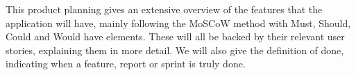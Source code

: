 This product planning gives an extensive overview of the features that the application will have, mainly following the MoSCoW method with Must, Should, Could and Would have elements. These will all be backed by their relevant user stories, explaining them in more detail. We will also give the definition of done, indicating when a feature, report or sprint is truly done.